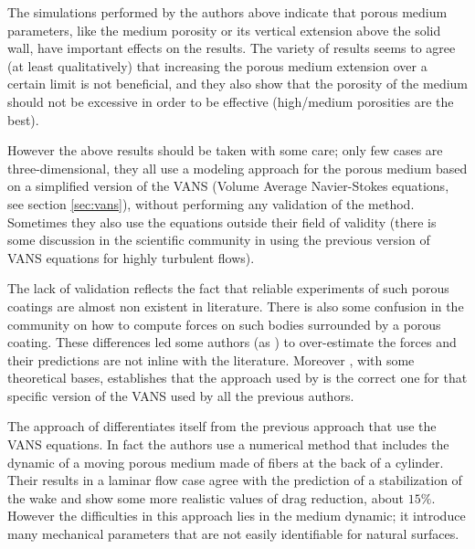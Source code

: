 The simulations performed by the authors above indicate that porous medium parameters, like the medium porosity or its vertical extension above the solid wall, have important effects on the results.
The variety of results seems to agree (at least qualitatively) that increasing the porous medium extension over a certain limit is not beneficial, and they also show that the porosity of the medium should not be excessive in order to be effective (high/medium porosities are the best).

However the above results should be taken with some care; only few cases are three-dimensional, they all use a modeling approach for the porous medium based on a simplified version of the VANS (Volume Average Navier-Stokes equations, see section \ref{sec:vans}), without performing any validation of the method.
Sometimes they also use the equations outside their field of validity (there is some discussion in the scientific community in using the previous version of VANS equations for highly turbulent flows).

The lack of validation reflects the fact that reliable experiments of such porous coatings are almost non existent in literature.
There is also some confusion in the community on how to compute forces on such bodies surrounded by a porous coating. These differences led some authors (as \citet{naito2012numerical}) to over-estimate the forces and their predictions are not inline with the literature.
Moreover \citet{caltagirone1994interaction}, with some theoretical bases, establishes that the approach used by \citet{bruneau2004passive} is the correct one for that specific version of the VANS used by all the previous authors. 

 
The approach of \citet{favier2009passive} differentiates itself from the previous approach that use the VANS equations. In fact the authors use a numerical method that includes the dynamic of a moving porous medium made of fibers at the back of a cylinder.
Their results in a laminar flow case agree with the prediction of a stabilization of the wake and show some more realistic values of drag reduction, about $15\%$.
However the difficulties in this approach lies in the medium dynamic; it introduce many mechanical parameters that are not easily identifiable for natural surfaces.

